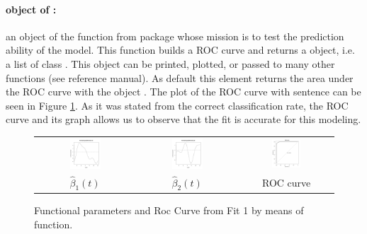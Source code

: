 \paragraph{  object of :} an object of the  function from  package whose mission is to test the prediction ability of the model. This function builds a ROC curve and returns a  object, i.e. a list of class . This object can be printed, plotted, or passed to many other functions (see reference manual). As default this element returns the area under the ROC curve with the object . The plot of the ROC curve with sentence  can be seen in Figure \ref{Fit1}. As it was stated from the correct classification rate, the ROC curve and its graph allows us to observe that the fit is accurate for this modeling.

\begin{figure}
\begin{center}
\begin{tabular}{ccc}
\includegraphics[width=0.33\textwidth]{Graphs/Fit1FunParam1.png} & \includegraphics[width=0.33\textwidth]{Graphs/Fit1FunParam2.png} &
\includegraphics[width=0.33\textwidth]{Graphs/Fit1ROC.png} \\
$\hat{\beta}_1(t)$ & $\hat{\beta}_2(t)$ & ROC curve \\
\end{tabular}
\end{center}
\caption{Functional parameters and Roc Curve from Fit 1 by means of  function.}
\label{Fit1}
\end{figure}


